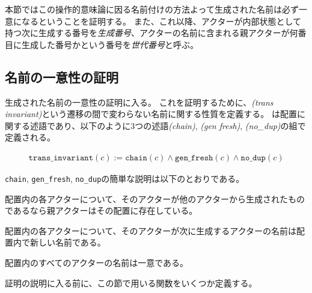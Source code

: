 本節ではこの操作的意味論に因る名前付けの方法よって生成された名前は必ず一意になるということを証明する。
また、これ以降、アクターが内部状態として持つ次に生成する番号を\emph{生成番号}、アクターの名前に含まれる親アクターが何番目に生成した番号かという番号を\emph{世代番号}と呼ぶ。

\subsection{名前の一意性の証明}

生成された名前の一意性の証明に入る。
これを証明するために、\emph{\transinv(trans invariant)}という遷移の間で変わらない名前に関する性質を定義する。
\transinv は配置に関する述語であり、以下のように3つの述語\emph{\chain (chain)}, \emph{\fresh (gen fresh)}, \emph{\nodup (no\_dup)}の組で定義される。

\begin{definition}{\transinv}
\begin{displaymath}
  \begin{array}{l}
    \texttt{trans\_invariant}(c) :=
    \texttt{chain}(c) \wedge \texttt{gen\_fresh}(c) \wedge \texttt{no\_dup}(c)
  \end{array}
\end{displaymath}
\end{definition}

\texttt{chain}, \texttt{gen\_fresh}, \texttt{no\_dup}の簡単な説明は以下のとおりである。

\begin{description}[style=nextline,leftmargin=12pt,parsep=0pt]
\item[\chain]
  配置内の各アクターについて、そのアクターが他のアクターから生成されたものであるなら親アクターはその配置に存在している。
\item[\fresh]
  配置内の各アクターについて、そのアクターが次に生成するアクターの名前は配置内で新しい名前である。
\item[\nodup]
  配置内のすべてのアクターの名前は一意である。
\end{description}

証明の説明に入る前に、この節で用いる関数をいくつか定義する。


